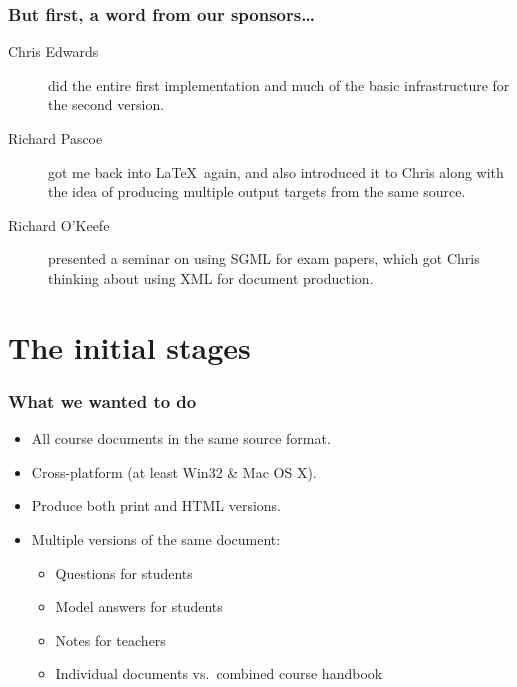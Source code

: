 \documentclass[pdftex]{beamer}
\begin{document}
\frame
{
	\frametitle{But first, a word from our sponsors\ldots}
	
	\begin{description}
	
		\item[Chris Edwards] did the entire first implementation and
		much of the basic infrastructure for the second version.
	
		\item[Richard Pascoe] got me back into \LaTeX\ again, and also
		introduced it to Chris along with the idea of producing multiple
		output targets from the same source.
		
		\item[Richard O'Keefe] presented a seminar on using SGML for
		exam papers, which got Chris thinking about using XML for
		document production.
	
	\end{description}
}


\section[History]{The initial stages}


\frame
{
	\frametitle{What we wanted to do}
	
	\begin{itemize}
	
		\item All course documents in the same source format.
		
		\item Cross-platform (at least Win32 \& Mac OS X).
		
		
		\item Produce both print and HTML versions.
		
		\item Multiple versions of the same document:
		
		\begin{itemize}
		
			\item Questions for students
			
			\item Model answers for students
			
			\item Notes for teachers
			
			\item Individual documents vs.\ combined course handbook
		
		\end{itemize}
	
	\end{itemize}
}
\end{document}

